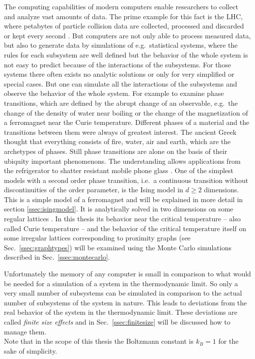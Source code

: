The computing capabilities of modern computers enable researchers to
collect and analyze vast amounts of data. The prime example for this fact
is the LHC, where petabytes of particle collision data are collected,
processed and discarded or kept every second \cite{LHC}.
But computers are not only able to process measured data, but
also to generate data by simulations of e.g.\ statistical systems, where
the rules for each subsystem are well defined but the behavior of the
whole system is not easy to predict because of the interactions of the
subsystems. For those systems there often exists no analytic solutions
or only for very simplified or special cases. But one can simulate all
the interactions of the subsystems and observe the behavior of the whole
system.
For example to examine phase transitions, which are defined by the abrupt
change of an observable, e.g.\ the change of the density of water near
boiling or the change of the magnetization of a ferromagnet near the
Curie temperature.
Different phases of a material and the transitions between them were
always of greatest interest. The ancient Greek thought that everything
consists of fire, water, air and earth, which are the archetypes of
phases. Still phase transitions are alone on the basis of their ubiquity
important phenomenons. The understanding allows applications from the
refrigerator to shatter resistant mobile phone glass \cite{PJournalGlass}.
One of the simplest models with a second order
phase transition, i.e.\ a continuous transition without discontinuities of
the order parameter, is the Ising model \cite{Ising1925} in \(d \ge 2\)
dimensions. This is a simple
model of a ferromagnet and will be explained in more detail in section
\ref{ssec:isingmodel}. It is analytically solved in two dimensions on
some regular lattices \cite{Onsager1944} \cite{Wannier1945}.
In this thesis its behavior near the critical temperature -- also called
Curie temperature -- and the behavior of the critical temperature itself
on some irregular lattices corresponding to proximity graphs
(see Sec.\ \ref{ssec:graphtypes}) will be examined using the Monte
Carlo simulations described in Sec.\ \ref{ssec:montecarlo}.

Unfortunately the memory of any computer is small in comparison to what
would be needed for a simulation of a system in the
thermodynamic limit. So only a very small number of subsystems can be
simulated in comparison to the actual number of subsystems
of the system in nature. This leads to deviations from the real behavior
of the system in the thermodynamic limit. These deviations are called
\emph{finite size effects} and in Sec.\ \ref{ssec:finitesize} will be
discussed how to manage them.\\

Note that in the scope of this thesis the Boltzmann constant is \(k_{B}=1\)
for the sake of simplicity.
